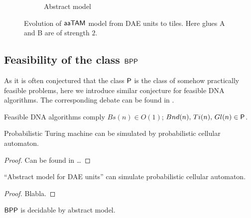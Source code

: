 \begin{figure}[h]
\begin{center}
\begin{subfigure}[b]{0.190\textwidth}
		\caption{Abstract model}
		\label{fig:abstract_model}
	\end{subfigure}
	\caption{Evolution of $\myatam$ model from DAE units to tiles. Here glues {\sf A} and {\sf B} are of strength $2$.}
	\label{fig:evolution}
\end{center}
\end{figure}

\subsection{Feasibility of the class $\BPP$}
	
	As it is often conjectured that the class $\P$ is the class of somehow practically feasible problems, here we introduce similar conjecture for feasible DNA algorithms. The corresponding debate can be found in \cite{book_comp}. %
	
	\begin{conj}   %
		Feasible DNA algorithms comply $Bs(n)\in O(1)$; $Bnd(n),\,Ti(n),\,Gl(n)\in \P$.   %
	\end{conj}
	
	\begin{thm}   %
		Probabilistic Turing machine can be simulated by probabilistic cellular automaton.
	\end{thm}
	
	\begin{proof}
		Can be found in \ldots
	\end{proof}
	
	\begin{thm}   %
		``Abstract model for DAE units'' can simulate probabilistic cellular automaton.
	\end{thm}
	
	\begin{proof}
		Blabla. %
	\end{proof}
	
	\begin{cor}
		$\BPP$ is decidable by abstract model.   %
	\end{cor}
	
